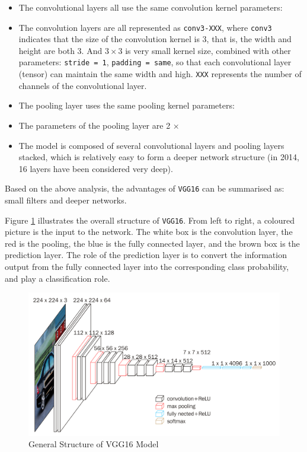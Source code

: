 \begin{itemize}
    \item The convolutional layers all use the same convolution kernel parameters: 
    \item [] The convolution layers are all represented as \verb|conv3-XXX|, where \verb|conv3| indicates that the size of the convolution kernel is 3, that is, the width and height are both 3. And $3\times3$ is very small kernel size, combined with other parameters: \verb|stride = 1|, \verb|padding = same|, so that each convolutional layer (tensor) can maintain the same width and high. \verb|XXX| represents the number of channels of the convolutional layer.
    \item The pooling layer uses the same pooling kernel parameters: 
    \item [] The parameters of the pooling layer are 2 ×
    \item The model is composed of several convolutional layers and pooling layers stacked, which is relatively easy to form a deeper network structure (in 2014, 16 layers have been considered very deep).
    
\end{itemize}

Based on the above analysis, the advantages of \verb|VGG16| can be summarised as: small filters and deeper networks.

Figure \ref{fig:vgg16strucure} illustrates the overall structure of \verb|VGG16|. From left to right, a coloured picture is the input to the network. The white box is the convolution layer, the red is the pooling, the blue is the fully connected layer, and the brown box is the prediction layer. The role of the prediction layer is to convert the information output from the fully connected layer into the corresponding class probability, and play a classification role.

\begin{figure}[h!]
\centering
\includegraphics[width=1\textwidth]{vgg16struc.pdf}
\caption{General Structure of VGG16 Model \cite{vgg16}}
\label{fig:vgg16strucure}
\end{figure}

